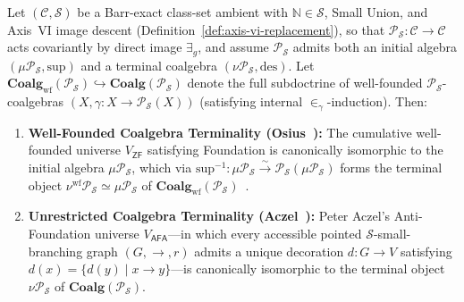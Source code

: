 \begin{theorem}\label{thm:axis-vii-foundation}%
%
%
Let $(\mathcal{C}, \mathcal{S})$ be a Barr-exact class-set ambient with $\mathbb{N} \in \mathcal{S}$, Small Union, and Axis~VI image descent (Definition~\ref{def:axis-vi-replacement}), so that $\mathcal{P}_{\mathcal{S}} : \mathcal{C} \to \mathcal{C}$ acts covariantly by direct image $\exists_g$, and assume $\mathcal{P}_{\mathcal{S}}$ admits both an initial algebra $(\mu \mathcal{P}_{\mathcal{S}}, \mathrm{sup})$ and a terminal coalgebra $(\nu \mathcal{P}_{\mathcal{S}}, \mathrm{des})$. Let $\mathbf{Coalg}_{\mathrm{wf}}(\mathcal{P}_{\mathcal{S}}) \hookrightarrow \mathbf{Coalg}(\mathcal{P}_{\mathcal{S}})$ denote the full subdoctrine of well-founded $\mathcal{P}_{\mathcal{S}}$-coalgebras $(X, \gamma : X \to \mathcal{P}_{\mathcal{S}}(X))$ (satisfying internal $\in_\gamma$-induction). Then:
\begin{enumerate}
  \item \textbf{Well-Founded Coalgebra Terminality (Osius~\cite{Osius74}):} The cumulative well-founded universe $V_{\mathsf{ZF}}$ satisfying Foundation is canonically isomorphic to the initial algebra $\mu \mathcal{P}_{\mathcal{S}}$, which via $\mathrm{sup}^{-1} : \mu \mathcal{P}_{\mathcal{S}} \xrightarrow{\sim} \mathcal{P}_{\mathcal{S}}(\mu \mathcal{P}_{\mathcal{S}})$ forms the terminal object $\nu^{\mathrm{wf}} \mathcal{P}_{\mathcal{S}} \simeq \mu \mathcal{P}_{\mathcal{S}}$ of $\mathbf{Coalg}_{\mathrm{wf}}(\mathcal{P}_{\mathcal{S}})$~\cite[Chs.~II--III]{JoyalMoerdijk95}.
  \item \textbf{Unrestricted Coalgebra Terminality (Aczel~\cite[Chs.~1--2, 6--7]{Aczel88}):} Peter Aczel's Anti-Foundation universe $V_{\mathsf{AFA}}$---in which every accessible pointed $\mathcal{S}$-small-branching graph $(G, \to, r)$ admits a unique decoration $d : G \to V$ satisfying $d(x) = \{d(y) \mid x \to y\}$---is canonically isomorphic to the terminal object $\nu \mathcal{P}_{\mathcal{S}}$ of $\mathbf{Coalg}(\mathcal{P}_{\mathcal{S}})$.

\end{enumerate}
\end{theorem}
